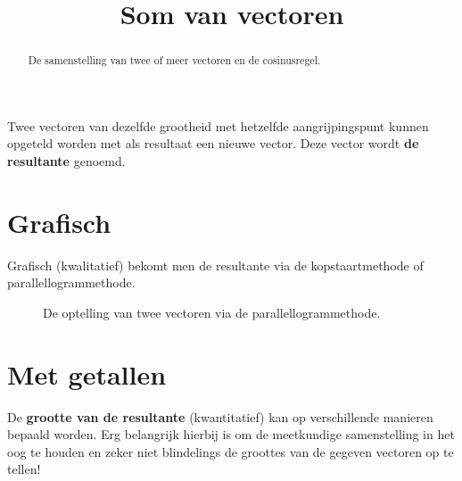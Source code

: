 \documentclass{ximera}
\title{Som van vectoren}
\begin{document}
\begin{abstract}
    De samenstelling van twee of meer vectoren en de cosinusregel.
\end{abstract}
\maketitle\label{sec:vec_optellen}

Twee vectoren van dezelfde grootheid met hetzelfde aangrijpingspunt kunnen opgeteld worden met als resultaat een nieuwe vector. Deze vector wordt \textbf{de resultante} genoemd. 

\section{Grafisch}
Grafisch (kwalitatief) bekomt men de resultante via de kopstaartmethode of parallellogrammethode.  

\begin{figure}[ht!]
    \captionsetup{width=0.85\textwidth}
    \begin{center}
    \end{center}
    \caption{De optelling van twee vectoren via de parallellogrammethode.}
    \label{fig:som_vectoren}
\end{figure}

\section{Met getallen}\label{s:vectoren_optellen}
De \textbf{grootte van de resultante} (kwantitatief) kan op verschillende manieren bepaald worden. Erg belangrijk hierbij is om de meetkundige samenstelling in het oog te houden en zeker niet blindelings de groottes van de gegeven vectoren op te tellen! 
\end{document}
